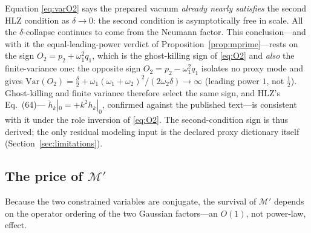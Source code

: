 \documentclass[11pt]{article}
\theoremstyle{definition}
\theoremstyle{remark}
\begin{document}
Equation \eqref{eq:varO2} says the prepared vacuum \emph{already
nearly satisfies} the second HLZ condition as $\delta\to0$: the
second condition is asymptotically free in scale. All the
$\delta$-collapse continues to come from the Neumann factor.
This conclusion---and with it the equal-leading-power verdict of
Proposition~\ref{prop:mprime}---rests on the sign
$O_{2}=p_{2}+\omega_{1}^{2}q_{1}$, which is the ghost-killing sign of
\eqref{eq:O2} and \emph{also} the finite-variance one: the opposite
sign $O_{2}=p_{2}-\omega_{1}^{2}q_{1}$ isolates no proxy mode and gives
$\mathrm{Var}(O_{2})=\tfrac{\delta}{2}
+\omega_{1}(\omega_{1}+\omega_{2})^{2}/(2\omega_{2}\delta)\to\infty$
(leading power $1$, not $\tfrac12$). Ghost-killing and finite variance
therefore select the same sign, and HLZ's Eq.~(64)---%
$\ddot h_{k}|_{0}=+k^{2}h_{k}|_{0}$, confirmed against the published
text---is consistent with it under the role inversion of
\eqref{eq:O2}. The second-condition sign is thus derived; the only
residual modeling input is the declared proxy dictionary itself
(Section~\ref{sec:limitations}).

\subsection{The price of \texorpdfstring{$\mathcal{M}'$}{M'}}

Because the two constrained variables are conjugate, the survival of
$\mathcal{M}'$ depends on the operator ordering of the two Gaussian factors---an
$O(1)$, not power-law, effect.
\end{document}

